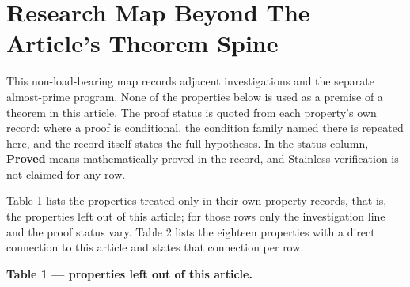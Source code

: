 \section{Research Map Beyond The Article's Theorem Spine}
\label{sec:appendix-b-research-map}

This non-load-bearing map records adjacent investigations and the separate
almost-prime program. None of the properties below is used as a premise of
a theorem in this article. The proof status is quoted from each property's
own record: where a proof is conditional, the condition family named there
is repeated here, and the record itself states the full hypotheses. In the
status column, \textbf{Proved} means mathematically proved in the record,
and Stainless verification is not claimed for any row.

Table 1 lists the properties treated only in their own property records,
that is, the properties left out of this article; for those rows only the
investigation line and the proof status vary. Table 2 lists the eighteen
properties with a direct connection to this article and states that
connection per row.

\noindent \textbf{Table 1 --- properties left out of this article.}

